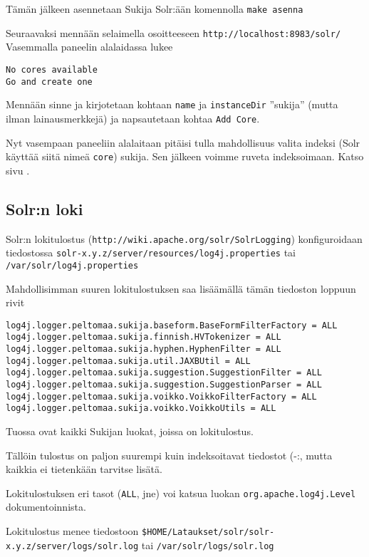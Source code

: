 \documentclass[12pt]{article}
\begin{document}
Tämän jälkeen asennetaan Sukija Solr:ään komennolla
\verb=make asenna=


Seuraavaksi mennään selaimella osoitteeseen \verb=http://localhost:8983/solr/=
Vasemmalla paneelin alalaidassa lukee 

\begin{verbatim}
No cores available
Go and create one
\end{verbatim}

Mennään sinne ja kirjotetaan kohtaan \verb=name= ja \verb=instanceDir=
''sukija'' (mutta ilman lainausmerkkejä) ja napsautetaan kohtaa
\verb=Add Core=.

Nyt vasempaan paneeliin alalaitaan pitäisi tulla mahdollisuus valita
indeksi (Solr käyttää siitä nimeä \verb=core=) sukija. Sen jälkeen
voimme ruveta indeksoimaan. Katso sivu .


\subsection*{Solr:n loki}

Solr:n lokitulostus (\verb=http://wiki.apache.org/solr/SolrLogging=)
konfiguroidaan tiedostossa
\verb=solr-x.y.z/server/resources/log4j.properties= tai
\verb=/var/solr/log4j.properties=

Mahdollisimman suuren lokitulostuksen saa lisäämällä tämän tiedoston
loppuun rivit

{\footnotesize
\begin{verbatim}
log4j.logger.peltomaa.sukija.baseform.BaseFormFilterFactory = ALL
log4j.logger.peltomaa.sukija.finnish.HVTokenizer = ALL
log4j.logger.peltomaa.sukija.hyphen.HyphenFilter = ALL
log4j.logger.peltomaa.sukija.util.JAXBUtil = ALL
log4j.logger.peltomaa.sukija.suggestion.SuggestionFilter = ALL
log4j.logger.peltomaa.sukija.suggestion.SuggestionParser = ALL
log4j.logger.peltomaa.sukija.voikko.VoikkoFilterFactory = ALL
log4j.logger.peltomaa.sukija.voikko.VoikkoUtils = ALL
\end{verbatim}
}

Tuossa ovat kaikki Sukijan luokat, joissa on lokitulostus.

Tällöin tulostus on paljon suurempi kuin indeksoitavat tiedostot (-:,
mutta kaikkia ei tietenkään tarvitse lisätä.

Lokitulostuksen eri tasot (\verb=ALL=, jne) voi katsua luokan
\verb=org.apache.log4j.Level= dokumentoinnista.

Lokitulostus menee tiedostoon
\verb=$HOME/Lataukset/solr/solr-x.y.z/server/logs/solr.log= tai
\verb=/var/solr/logs/solr.log=
\end{document}
